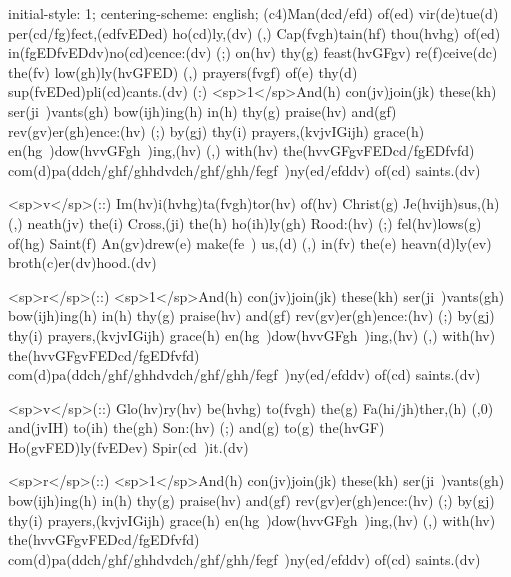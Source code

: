 initial-style: 1;
centering-scheme: english;
(c4)Man(dcd/efd) of(ed) vir(de)tue(d) per(cd/fg)fect,(edfvEDed) ho(cd)ly,(dv) (,) Cap(fvgh)tain(hf) thou(hvhg) of(ed) in(fgEDfvEDdv)no(cd)cence:(dv) (;) on(hv) thy(g) feast(hvGFgv) re(f)ceive(dc) the(fv) low(gh)ly(hvGFED) (,) prayers(fvgf) of(e) thy(d) sup(fvEDed)pli(cd)cants.(dv) (:) <sp>1</sp>And(h) con(jv)join(jk) these(kh) ser(ji~)vants(gh) bow(ijh)ing(h) in(h) thy(g) praise(hv) and(gf) rev(gv)er(gh)ence:(hv) (;) by(gj) thy(i) prayers,(kvjvIGijh) grace(h) en(hg~)dow(hvvGFgh~)ing,(hv) (,) with(hv) the(hvvGFgvFEDcd/fgEDfvfd) com(d)pa(ddch/ghf/ghhdvdch/ghf/ghh/fegf~)ny(ed/efddv) of(cd) saints.(dv)

<sp>v</sp>(::) Im(hv)i(hvhg)ta(fvgh)tor(hv) of(hv) Christ(g) Je(hvijh)sus,(h) (,) neath(jv) the(i) Cross,(ji) the(h) ho(ih)ly(gh) Rood:(hv) (;) fel(hv)lows(g) of(hg) Saint(f) An(gv)drew(e) make(fe~) us,(d) (,) in(fv) the(e) heavn(d)ly(ev) broth(c)er(dv)hood.(dv)

<sp>r</sp>(::) <sp>1</sp>And(h) con(jv)join(jk) these(kh) ser(ji~)vants(gh) bow(ijh)ing(h) in(h) thy(g) praise(hv) and(gf) rev(gv)er(gh)ence:(hv) (;) by(gj) thy(i) prayers,(kvjvIGijh) grace(h) en(hg~)dow(hvvGFgh~)ing,(hv) (,) with(hv) the(hvvGFgvFEDcd/fgEDfvfd) com(d)pa(ddch/ghf/ghhdvdch/ghf/ghh/fegf~)ny(ed/efddv) of(cd) saints.(dv)

<sp>v</sp>(::) Glo(hv)ry(hv) be(hvhg) to(fvgh) the(g) Fa(hi/jh)ther,(h) (,0) and(jvIH) to(ih) the(gh) Son:(hv) (;) and(g) to(g) the(hvGF) Ho(gvFED)ly(fvEDev) Spir(cd~)it.(dv)

<sp>r</sp>(::) <sp>1</sp>And(h) con(jv)join(jk) these(kh) ser(ji~)vants(gh) bow(ijh)ing(h) in(h) thy(g) praise(hv) and(gf) rev(gv)er(gh)ence:(hv) (;) by(gj) thy(i) prayers,(kvjvIGijh) grace(h) en(hg~)dow(hvvGFgh~)ing,(hv) (,) with(hv) the(hvvGFgvFEDcd/fgEDfvfd) com(d)pa(ddch/ghf/ghhdvdch/ghf/ghh/fegf~)ny(ed/efddv) of(cd) saints.(dv)